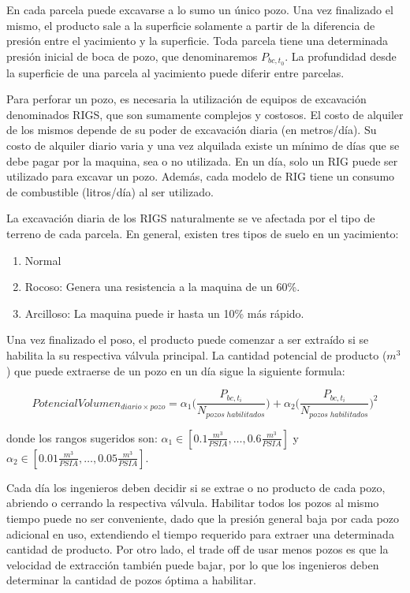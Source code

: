 \documentclass[10pt,a4paper]{article}
\begin{document}
En cada parcela puede excavarse a lo sumo un único pozo. Una vez finalizado el mismo, el producto sale a la superficie solamente a partir de la diferencia de presión entre el yacimiento y la superficie. Toda parcela tiene una determinada presión inicial de boca de pozo, que denominaremos $P_{bc,t_0}$. La profundidad desde la superficie de una parcela al yacimiento puede diferir entre parcelas.

Para perforar un pozo, es necesaria la utilización de equipos de excavación denominados RIGS, que son sumamente complejos y costosos. El costo de alquiler de los mismos depende de su poder de excavación diaria (en metros/día). Su costo de alquiler diario varia y una vez alquilada existe un mínimo de días que se debe pagar por la maquina, sea o no utilizada. En un día, solo un RIG puede ser utilizado para excavar un pozo. Además, cada modelo de RIG tiene un consumo de combustible (litros/día) al ser utilizado.

La excavación diaria de los RIGS naturalmente se ve afectada por el tipo de terreno de cada parcela. En general, existen tres tipos de suelo en un yacimiento:
\begin{enumerate}
\item Normal
\item Rocoso: Genera una resistencia a la maquina de un 60\%.
\item Arcilloso: La maquina puede ir hasta un 10\% más rápido.
\end{enumerate}

Una vez finalizado el poso, el producto puede comenzar a ser extraído si se habilita la su respectiva válvula principal. La cantidad potencial de producto ($m^3$) que puede extraerse de un pozo en un día sigue la siguiente formula:

\begin{equation} \label{eq:pressure}
PotencialVolumen_{diario \times pozo} = \alpha_1 \Bigg(\frac{P_{bc, t_i}}{N_{pozos \; habilitados}}\Bigg) +  \alpha_2 \Bigg(\frac{P_{bc, t_i}}{N_{pozos \; habilitados}}\Bigg)^2
\end{equation}

donde los rangos sugeridos son: $\alpha_1 \in [0.1 \frac{m^3}{PSIA}, \ldots, 0.6 \frac{m^3}{PSIA}]$ y $\alpha_2 \in [0.01 \frac{m^3}{PSIA}, \ldots, 0.05\frac{m^3}{PSIA}]$.

Cada día los ingenieros deben decidir si se extrae o no producto de cada pozo, abriendo o cerrando la respectiva válvula. Habilitar todos los pozos al mismo tiempo puede no ser conveniente, dado que la presión general baja por cada pozo adicional en uso, extendiendo el tiempo requerido para extraer una determinada cantidad de producto. Por otro lado, el trade off de usar menos pozos es que la velocidad de extracción también puede bajar, por lo que los ingenieros deben determinar la cantidad de pozos óptima a habilitar.
\end{document}

